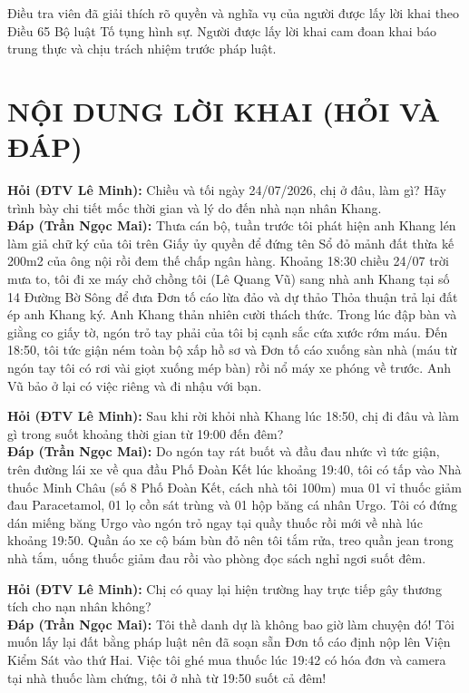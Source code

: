\documentclass[12pt,a4paper]{article}
\begin{document}
\noindent Điều tra viên đã giải thích rõ quyền và nghĩa vụ của người được lấy lời khai theo Điều 65 Bộ luật Tố tụng hình sự. Người được lấy lời khai cam đoan khai báo trung thực và chịu trách nhiệm trước pháp luật.

\section*{NỘI DUNG LỜI KHAI (HỎI VÀ ĐÁP)}

\noindent \textbf{Hỏi (ĐTV Lê Minh):} Chiều và tối ngày 24/07/2026, chị ở đâu, làm gì? Hãy trình bày chi tiết mốc thời gian và lý do đến nhà nạn nhân Khang.\\
\textbf{Đáp (Trần Ngọc Mai):} Thưa cán bộ, tuần trước tôi phát hiện anh Khang lén làm giả chữ ký của tôi trên Giấy ủy quyền để đứng tên Sổ đỏ mảnh đất thừa kế 200m2 của ông nội rồi đem thế chấp ngân hàng. Khoảng 18:30 chiều 24/07 trời mưa to, tôi đi xe máy chở chồng tôi (Lê Quang Vũ) sang nhà anh Khang tại số 14 Đường Bờ Sông để đưa Đơn tố cáo lừa đảo và dự thảo Thỏa thuận trả lại đất ép anh Khang ký. Anh Khang thản nhiên cười thách thức. Trong lúc đập bàn và giằng co giấy tờ, ngón trỏ tay phải của tôi bị cạnh sắc cứa xước rớm máu. Đến 18:50, tôi tức giận ném toàn bộ xấp hồ sơ và Đơn tố cáo xuống sàn nhà (máu từ ngón tay tôi có rơi vài giọt xuống mép bàn) rồi nổ máy xe phóng về trước. Anh Vũ bảo ở lại có việc riêng và đi nhậu với bạn.

\noindent \textbf{Hỏi (ĐTV Lê Minh):} Sau khi rời khỏi nhà Khang lúc 18:50, chị đi đâu và làm gì trong suốt khoảng thời gian từ 19:00 đến đêm?\\
\textbf{Đáp (Trần Ngọc Mai):} Do ngón tay rát buốt và đầu đau nhức vì tức giận, trên đường lái xe về qua đầu Phố Đoàn Kết lúc khoảng 19:40, tôi có tấp vào Nhà thuốc Minh Châu (số 8 Phố Đoàn Kết, cách nhà tôi 100m) mua 01 vỉ thuốc giảm đau Paracetamol, 01 lọ cồn sát trùng và 01 hộp băng cá nhân Urgo. Tôi có đứng dán miếng băng Urgo vào ngón trỏ ngay tại quầy thuốc rồi mới về nhà lúc khoảng 19:50. Quần áo xe cộ bám bùn đỏ nên tôi tắm rửa, treo quần jean trong nhà tắm, uống thuốc giảm đau rồi vào phòng đọc sách nghỉ ngơi suốt đêm.

\noindent \textbf{Hỏi (ĐTV Lê Minh):} Chị có quay lại hiện trường hay trực tiếp gây thương tích cho nạn nhân không?\\
\textbf{Đáp (Trần Ngọc Mai):} Tôi thề danh dự là không bao giờ làm chuyện đó! Tôi muốn lấy lại đất bằng pháp luật nên đã soạn sẵn Đơn tố cáo định nộp lên Viện Kiểm Sát vào thứ Hai. Việc tôi ghé mua thuốc lúc 19:42 có hóa đơn và camera tại nhà thuốc làm chứng, tôi ở nhà từ 19:50 suốt cả đêm!
\end{document}
